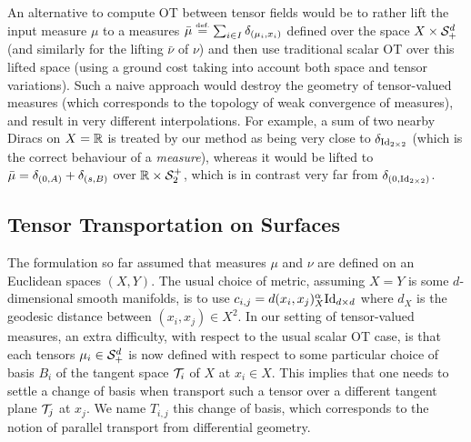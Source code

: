 \begin{rem}
An alternative to compute OT between tensor fields would be to rather lift the input measure $\mu$ to a measures $\bar \mu \eqdef \sum_{i \in I}  \de_{(\mu_i,x_i)}$ defined over the space $X \times \mathcal{S}_+^d$ (and similarly for the lifting $\bar\nu$ of $\nu$) and then use traditional scalar OT over this lifted space (using a ground cost taking into account both space and tensor variations). 
%
Such a naive approach would destroy the geometry of tensor-valued measures (which corresponds to the topology of weak convergence of measures), and result in very different interpolations. For example, a sum of two nearby Diracs on $X=\mathbb{R}$  
is treated by our method as being very close to $\delta_{\mathrm{Id}_{2\times 2}}$ (which is the correct behaviour of a \emph{measure}), whereas it would be lifted to 
$\bar\mu=\delta_{(0,A)}+\delta_{(s,B)}$ over $\mathbb{R} \times \mathcal{S}_2^+$, which is in contrast very far from $\delta_{(0,\mathrm{Id}_{2\times 2})}$.
\end{rem}


\subsection{Tensor Transportation on Surfaces}



The formulation so far assumed that measures $\mu$ and $\nu$ are defined on an Euclidean spaces $(X,Y)$. The usual choice of metric, assuming $X=Y$ is some $d$-dimensional smooth manifolds, is to use $c_{i,j} = d(x_i,x_j)_X^\alpha \mathrm{Id}_{d \times d}$ where $d_X$ is the geodesic distance between $(x_i,x_j) \in X^2$. 
%
In our setting of tensor-valued measures, an extra difficulty, with respect to the usual scalar OT case, is that each tensors $\mu_i \in \mathcal{S}_+^d$ is now defined with respect to some particular choice of basis $B_i$ of the tangent space $\mathcal{T}_i$ of $X$ at $x_i \in X$. 
% 
This implies that one needs to settle a change of basis when transport such a tensor over a different tangent plane $\mathcal{T}_j$ at $x_j$. We name $T_{i,j}$ this change of basis, which corresponds to the notion of parallel transport from differential geometry.

